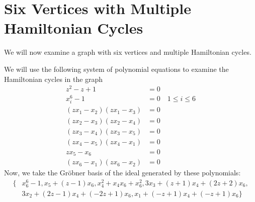 \documentclass[letterpaper]{article}
\newcommand{\aln}[1]{\begin{align*} #1 \end{align*}} %
\begin{document}
\section{Six Vertices with Multiple Hamiltonian Cycles}
We will now examine a graph with six vertices and multiple Hamiltonian cycles.
\begin{center}
\end{center}
We will use the following system of polynomial equations to examine the Hamiltonian cycles in the graph
\aln{
  z^2 - z + 1 &= 0\\
  x_i^6 - 1 &= 0 \quad 1 \leq i \leq 6\\
  (z x_1 - x_2)(z x_1 - x_3) &= 0\\
  (z x_2 - x_3)(z x_2 - x_4) &= 0\\
  (z x_3 - x_4)(z x_3 - x_5) &= 0\\
  (z x_4 - x_5)(z x_4 - x_1) &= 0\\
  z x_5 - x_6 &= 0\\
  (z x_6 - x_1)(z x_6 - x_2) &= 0
}
Now, we take the Gr\"obner basis of the ideal generated by these polynomials:
\aln{
  \{& x_6^6-1, x_5+(z-1)x_6, x_4^2+x_4x_6+x_6^2, 3x_3+(z+1)x_4+(2z+2)x_6,\\& 3x_2+(2z-1)x_4+(-2z+1)x_6, x_1+(-z+1)x_4+(-z+1)x_6\}
}

\newpage
\end{document}

